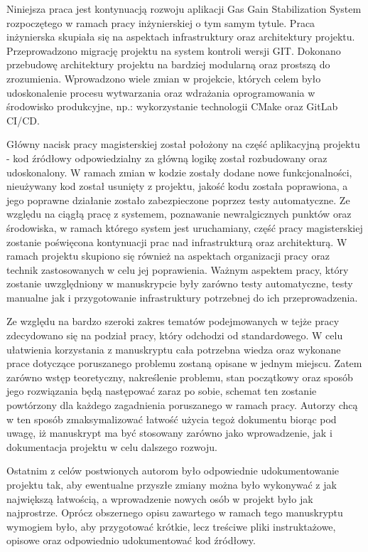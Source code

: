 Niniejsza praca jest kontynuacją rozwoju aplikacji Gas Gain Stabilization System rozpoczętego w ramach pracy
inżynierskiej o tym samym tytule. Praca inżynierska skupiała się na aspektach infrastruktury oraz architektury projektu. Przeprowadzono migrację projektu na system kontroli wersji GIT. Dokonano przebudowę architektury projektu na bardziej modularną oraz prostszą do zrozumienia. Wprowadzono wiele zmian w projekcie, których celem było udoskonalenie procesu wytwarzania oraz wdrażania oprogramowania w środowisko produkcyjne, np.: wykorzystanie technologii CMake oraz GitLab CI/CD.


Główny nacisk pracy magisterskiej został położony na część aplikacyjną projektu - kod źródłowy odpowiedzialny za
główną logikę został rozbudowany oraz udoskonalony. W ramach zmian w kodzie zostały dodane nowe funkcjonalności,
nieużywany kod został usunięty z projektu, jakość kodu została poprawiona, a jego poprawne działanie zostało
zabezpieczone poprzez testy automatyczne. Ze względu na ciągłą pracę z systemem, poznawanie newralgicznych punktów oraz środowiska, w ramach którego system jest uruchamiany, część pracy magisterskiej zostanie poświęcona kontynuacji prac nad infrastrukturą oraz architekturą. W ramach projektu skupiono się również na aspektach organizacji pracy oraz technik zastosowanych w celu jej poprawienia. Ważnym aspektem pracy, który zostanie uwzględniony w manuskrypcie były zarówno testy automatyczne, testy manualne jak i przygotowanie infrastruktury potrzebnej do ich przeprowadzenia.


Ze względu na bardzo szeroki zakres tematów podejmowanych w tejże pracy zdecydowano się na podział pracy, który odchodzi od standardowego. W celu ułatwienia korzystania z manuskryptu cała potrzebna wiedza oraz wykonane prace dotyczące poruszanego problemu zostaną opisane w jednym miejscu. Zatem zarówno wstęp teoretyczny, nakreślenie problemu, stan początkowy oraz sposób jego rozwiązania będą następować zaraz po sobie, schemat ten zostanie powtórzony dla każdego zagadnienia poruszanego w ramach pracy. Autorzy chcą w ten sposób zmaksymalizować łatwość użycia tegoż dokumentu biorąc pod uwagę, iż manuskrypt ma być stosowany zarówno jako wprowadzenie, jak i dokumentacja projektu w celu dalszego rozwoju.


Ostatnim z celów postwionych autorom było odpowiednie udokumentowanie projektu tak, aby ewentualne przyszłe zmiany można było wykonywać z jak największą łatwością, a wprowadzenie nowych osób w projekt było jak najprostrze. Oprócz obszernego opisu zawartego w ramach tego manuskryptu wymogiem było, aby przygotować krótkie, lecz treściwe pliki instruktażowe, opisowe oraz odpowiednio udokumentować kod źródłowy.